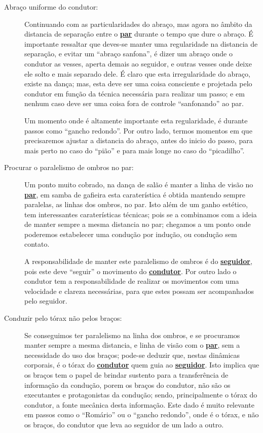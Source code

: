\begin{description}
\item[Abraço uniforme do condutor:] Continuando com as particularidades do abraço,
mas agora no âmbito da distancia de separação entre o \hyperref[def:Par]{\textbf{par}} durante o tempo que dure o abraço.
É importante ressaltar que deves-se manter uma regularidade na distancia de separação,
e evitar um ``abraço sanfona'', é dizer um abraço onde o condutor as vesses, 
aperta demais ao seguidor, e outras vesses onde deixe ele solto e mais separado dele.
É claro que esta irregularidade do abraço, existe na dança; 
mas, esta deve ser uma coisa consciente e projetada 
pelo condutor em função da técnica necessária para realizar um passo; 
e em nenhum caso deve ser uma coisa  fora de controle ``sanfonando'' ao par.

Um momento onde é altamente importante esta regularidade, 
é durante passos como ``gancho redondo''.
Por outro lado, termos momentos em que precisaremos ajustar a distancia do abraço,
antes do inicio do passo, para mais perto no caso do ``pião'' e para mais longe no caso do ``picadilho''.

\item[Procurar o paralelismo de ombros no par:] 
Um ponto muito cobrado, na dança de salão é manter a linha de visão no \hyperref[def:Par]{\textbf{par}},
em samba de gafieira esta caraterística é obtida mantendo sempre paralelas, as linhas dos ombros, no par.
Isto além de um ganho estético, tem interessantes caraterísticas técnicas;
pois se a combinamos com a ideia de manter sempre a mesma distancia no par;
chegamos a um ponto onde poderemos estabelecer uma condução por indução, ou condução sem contato.

A responsabilidade de manter este paralelismo de ombros é do \hyperref[def:Seguidor]{\textbf{seguidor}},
pois este deve ``seguir'' o movimento do \hyperref[def:Condutor]{\textbf{condutor}}.
Por outro lado o condutor tem a responsabilidade de realizar os movimentos com uma velocidade e clareza necessárias, 
para que estes possam ser acompanhados pelo seguidor.

\item[Conduzir pelo tórax não pelos braços:] 
Se conseguimos ter paralelismo na linha dos ombros,
e se procuramos manter sempre a mesma distancia, 
e linha de visão com o \hyperref[def:Par]{\textbf{par}}, 
sem a necessidade do uso dos braços;
pode-se deduzir que, nestas dinâmicas corporais,
é o tórax do \hyperref[def:Condutor]{\textbf{condutor}} quem guia ao \hyperref[def:Seguidor]{\textbf{seguidor}}.
Isto implica que os braços tem o papel de brindar sustento para a transferência de informação da condução,
porem os braços do condutor, não são os executantes e protagonistas da condução;
sendo, principalmente o tórax do condutor, a fonte mecânica desta informação.
Este dado é muito relevante em passos como o ``Romário'' ou o ``gancho redondo'',
onde é o tórax, e não os braços, do condutor que leva ao seguidor de um lado a outro. 


\end{description}
